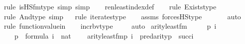 \begin{isabellebody}
{\isacharparenleft}{\kern0pt}rule\ is{\isacharunderscore}{\kern0pt}HS{\isacharunderscore}{\kern0pt}fm{\isacharunderscore}{\kern0pt}type{\isacharcomma}{\kern0pt}\ simp{\isacharcomma}{\kern0pt}\ simp{\isacharparenright}{\kern0pt}\isanewline
\ \ \isamarkupfalse%
\ ren{\isacharunderscore}{\kern0pt}least{\isacharunderscore}{\kern0pt}index{\isacharunderscore}{\kern0pt}def\ \isanewline
\ \ \isamarkupfalse%
{\isacharparenleft}{\kern0pt}rule\ Exists{\isacharunderscore}{\kern0pt}type{\isacharparenright}{\kern0pt}{\isacharplus}{\kern0pt}\isanewline
\ \ \isamarkupfalse%
{\isacharparenleft}{\kern0pt}rule\ And{\isacharunderscore}{\kern0pt}type{\isacharcomma}{\kern0pt}\ simp{\isacharparenright}{\kern0pt}{\isacharplus}{\kern0pt}\isanewline
\ \ \isamarkupfalse%
{\isacharparenleft}{\kern0pt}rule\ iterates{\isacharunderscore}{\kern0pt}type{\isacharparenright}{\kern0pt}\isanewline
\ \ \isamarkupfalse%
\ assms\ forcesHS{\isacharunderscore}{\kern0pt}type\ \isanewline
\ \ \ \ \isamarkupfalse%
\ auto{\isacharbrackleft}{\kern0pt}{}{\isacharbrackright}{\kern0pt}\isanewline
\ \ \isamarkupfalse%
{\isacharparenleft}{\kern0pt}rule\ function{\isacharunderscore}{\kern0pt}value{\isacharunderscore}{\kern0pt}in{\isacharparenright}{\kern0pt}\isanewline
\ \ \isamarkupfalse%
\ incr{\isacharunderscore}{\kern0pt}bv{\isacharunderscore}{\kern0pt}type\ \isanewline
\ \ \isamarkupfalse%
\ auto%
\endisatagproof
{\isafoldproof}%
%
\isadelimproof
\isanewline
%
\endisadelimproof
\isanewline
{}\isamarkupfalse%
\ arity{\isacharunderscore}{\kern0pt}least{\isacharunderscore}{\kern0pt}fm\ {\isacharcolon}{\kern0pt}\ \isanewline
\ \ \ p\ i\isanewline
\ \ \ {\isachardoublequoteopen}p\ {\isasymin}\ formula{\isachardoublequoteclose}\ {\isachardoublequoteopen}i\ {\isasymin}\ nat{\isachardoublequoteclose}\ \isanewline
\ \ \ {\isachardoublequoteopen}arity{\isacharparenleft}{\kern0pt}least{\isacharunderscore}{\kern0pt}fm{\isacharparenleft}{\kern0pt}p{\isacharcomma}{\kern0pt}\ i{\isacharparenright}{\kern0pt}{\isacharparenright}{\kern0pt}\ {\isasymle}\ pred{\isacharparenleft}{\kern0pt}arity{\isacharparenleft}{\kern0pt}p{\isacharparenright}{\kern0pt}{\isacharparenright}{\kern0pt}\ {\isasymunion}\ succ{\isacharparenleft}{\kern0pt}i{\isacharparenright}{\kern0pt}{\isachardoublequoteclose}\ \isanewline
%
\isadelimproof
\ \ %
\endisadelimproof
%
\isatagproof
{}\isamarkupfalse%

\end{isabellebody}
